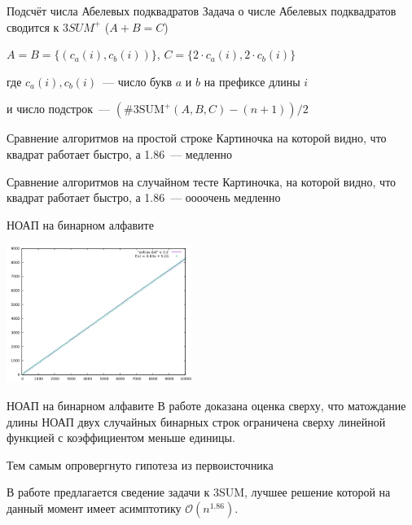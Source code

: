 \documentclass[hyperref=unicode,graphics=pdflatex,12pt]{beamer}
\begin{document}
\begin{frame}{Подсчёт числа Абелевых подквадратов}
Задача о числе Абелевых подквадратов сводится к $3SUM^+$ ($A + B = C$)
\vspace{0.5cm}

 $A = B = \{(c_a(i), c_b(i))\}$, $C = \{2 \cdot c_a(i), 2 \cdot c_b(i)\}$
\vspace{0.5cm}

где $c_a(i), c_b(i)$~--- число букв $a$ и $b$ на префиксе длины $i$
\vspace{0.5cm}

 и число подстрок~--- $(\#3\text{SUM}^+(A, B, C) - (n + 1)) / 2$

\end{frame}

\begin{frame}{Сравнение алгоритмов на простой строке}
Картиночка на которой видно, что квадрат работает быстро, а 1.86~--- медленно
\end{frame}

\begin{frame}{Сравнение алгоритмов на случайном тесте}
Картиночка, на которой видно, что квадрат работает быстро, а 1.86~--- оооочень медленно
\end{frame}

\begin{frame}{НОАП на бинарном алфавите}
\begin{center}
\includegraphics[width=6cm]{pics/avlcas.png}
\end{center}
\end{frame}

\begin{frame}{НОАП на бинарном алфавите}
В работе доказана оценка сверху, что матождание длины НОАП двух случайных бинарных строк
ограничена сверху линейной функцией с коэффициентом меньше единицы.

Тем самым опровергнуто гипотеза из первоисточника

\vspace{0.5cm}
В работе предлагается сведение задачи к 3SUM, лучшее решение которой на данный момент имеет
асимптотику $\mathcal{O}(n^{1.86})$.
\end{frame}
\end{document}
